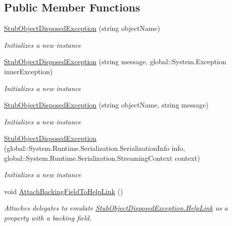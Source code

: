 \subsection*{Public Member Functions}
\begin{DoxyCompactItemize}
\item 
\hyperlink{class_system_1_1_fakes_1_1_stub_object_disposed_exception_a8f82f58fc81b9fa1d324294a699daa7c}{Stub\-Object\-Disposed\-Exception} (string object\-Name)
\begin{DoxyCompactList}\small\item\em Initializes a new instance\end{DoxyCompactList}\item 
\hyperlink{class_system_1_1_fakes_1_1_stub_object_disposed_exception_a1164199c19d04c68bb38a319e5c2c64b}{Stub\-Object\-Disposed\-Exception} (string message, global\-::\-System.\-Exception inner\-Exception)
\begin{DoxyCompactList}\small\item\em Initializes a new instance\end{DoxyCompactList}\item 
\hyperlink{class_system_1_1_fakes_1_1_stub_object_disposed_exception_ac5e0d08d7b659d91095dc00150ef8014}{Stub\-Object\-Disposed\-Exception} (string object\-Name, string message)
\begin{DoxyCompactList}\small\item\em Initializes a new instance\end{DoxyCompactList}\item 
\hyperlink{class_system_1_1_fakes_1_1_stub_object_disposed_exception_acbc78ecebe57cb22855f77fa98336489}{Stub\-Object\-Disposed\-Exception} (global\-::\-System.\-Runtime.\-Serialization.\-Serialization\-Info info, global\-::\-System.\-Runtime.\-Serialization.\-Streaming\-Context context)
\begin{DoxyCompactList}\small\item\em Initializes a new instance\end{DoxyCompactList}\item 
void \hyperlink{class_system_1_1_fakes_1_1_stub_object_disposed_exception_a07b01b21b44579bdc622362ee850d6ad}{Attach\-Backing\-Field\-To\-Help\-Link} ()
\begin{DoxyCompactList}\small\item\em Attaches delegates to emulate \hyperlink{class_system_1_1_fakes_1_1_stub_object_disposed_exception_a3eb40fb2f33e001c355468139520668d}{Stub\-Object\-Disposed\-Exception.\-Help\-Link} as a property with a backing field.\end{DoxyCompactList}\item 

\end{DoxyCompactItemize}
